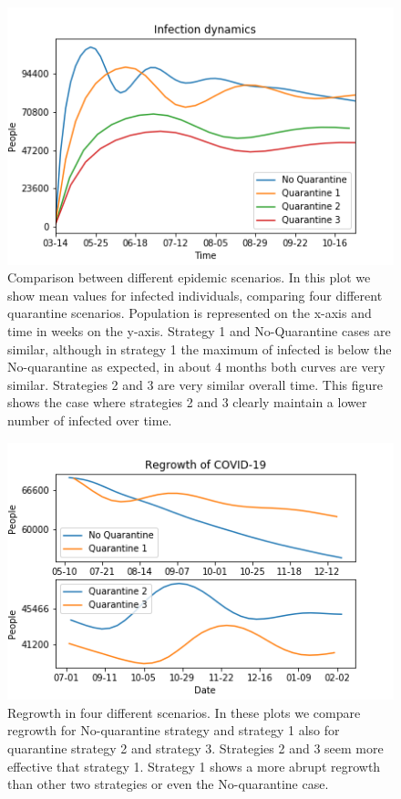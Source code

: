 \documentclass[11pt,a4paper,reqno]{amsart}
\theoremstyle{definition}
\theoremstyle{remark}
\begin{document}
\begin{figure}[H]
    \centering
    \includegraphics[]{InfectDYn_mejor.png}
    \caption{Comparison between different epidemic scenarios. In this plot we show mean values for infected individuals, comparing four different quarantine scenarios. Population is represented on the x-axis and time in weeks on the y-axis. Strategy 1 and No-Quarantine cases are similar, although in strategy 1 the maximum of infected is below the No-quarantine as expected, in about 4 months both curves are very similar. Strategies 2 and 3 are very similar overall time. This figure shows the case where strategies 2 and 3 clearly maintain a lower number of infected over time.}
    \label{fig:infdyn}
\end{figure}
\begin{figure}[H]
    \centering
    \includegraphics[]{rebote_1.png}
    \caption{Regrowth in four  different scenarios. In these plots we compare regrowth for No-quarantine strategy and strategy 1 also for quarantine strategy 2 and strategy 3. Strategies 2 and 3 seem more effective that strategy 1. Strategy 1 shows a more abrupt regrowth than other two strategies or even the No-quarantine case.}
    \label{fig:rebote}
\end{figure}
\end{document}
